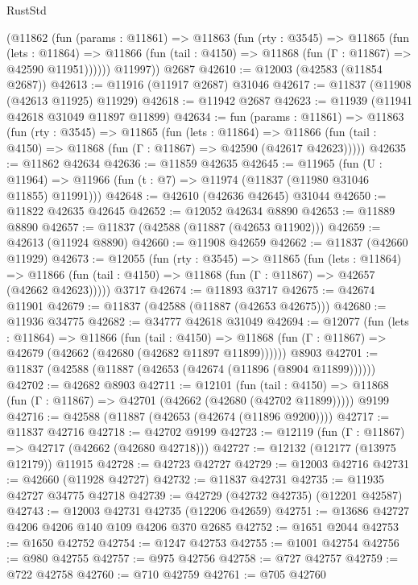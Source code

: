 \begin{lexlean}{RustStd}
\begin{coremodule}
        (@11862
          (fun (params : @11861) =>
          @11863
            (fun (rty : @3545) =>
            @11865
              (fun (lets : @11864) =>
              @11866 (fun (tail : @4150) => @11868 (fun (Γ : @11867) => @42590 @11951))))))
        @11997))
    @2687
@42610 := @12003 (@42583 (@11854 @2687))
@42613 := @11916 (@11917 @2687) @31046
@42617 := @11837 (@11908 (@42613 @11925) @11929)
@42618 := @11942 @2687
@42623 := @11939 (@11941 @42618 @31049 @11897 @11899)
@42634 := fun (params : @11861) =>
  @11863
    (fun (rty : @3545) =>
    @11865
      (fun (lets : @11864) =>
      @11866 (fun (tail : @4150) => @11868 (fun (Γ : @11867) => @42590 (@42617 @42623)))))
@42635 := @11862 @42634
@42636 := @11859 @42635
@42645 := @11965
    (fun (U : @11964) => @11966 (fun (t : @7) => @11974 (@11837 (@11980 @31046 @11855) @11991)))
@42648 := @42610 (@42636 @42645) @31044
@42650 := @11822 @42635 @42645
@42652 := @12052 @42634 @8890
@42653 := @11889 @8890
@42657 := @11837 (@42588 (@11887 (@42653 @11902)))
@42659 := @42613 (@11924 @8890)
@42660 := @11908 @42659
@42662 := @11837 (@42660 @11929)
@42673 := @12055
    (fun (rty : @3545) =>
    @11865
      (fun (lets : @11864) =>
      @11866 (fun (tail : @4150) => @11868 (fun (Γ : @11867) => @42657 (@42662 @42623)))))
    @3717
@42674 := @11893 @3717
@42675 := @42674 @11901
@42679 := @11837 (@42588 (@11887 (@42653 @42675)))
@42680 := @11936 @34775
@42682 := @34777 @42618 @31049
@42694 := @12077
    (fun (lets : @11864) =>
    @11866
      (fun (tail : @4150) =>
      @11868 (fun (Γ : @11867) => @42679 (@42662 (@42680 (@42682 @11897 @11899))))))
    @8903
@42701 := @11837 (@42588 (@11887 (@42653 (@42674 (@11896 (@8904 @11899))))))
@42702 := @42682 @8903
@42711 := @12101
    (fun (tail : @4150) => @11868 (fun (Γ : @11867) => @42701 (@42662 (@42680 (@42702 @11899)))))
    @9199
@42716 := @42588 (@11887 (@42653 (@42674 (@11896 @9200))))
@42717 := @11837 @42716
@42718 := @42702 @9199
@42723 := @12119 (fun (Γ : @11867) => @42717 (@42662 (@42680 @42718)))
@42727 := @12132 (@12177 (@13975 @12179)) @11915
@42728 := @42723 @42727
@42729 := @12003 @42716
@42731 := @42660 (@11928 @42727)
@42732 := @11837 @42731
@42735 := @11935 @42727 @34775 @42718
@42739 := @42729 (@42732 @42735) (@12201 @42587)
@42743 := @12003 @42731 @42735 (@12206 @42659)
@42751 := @13686 @42727 @4206 @4206 @140 @109 @4206 @370 @2685
@42752 := @1651 @2044
@42753 := @1650 @42752
@42754 := @1247 @42753
@42755 := @1001 @42754
@42756 := @980 @42755
@42757 := @975 @42756
@42758 := @727 @42757
@42759 := @722 @42758
@42760 := @710 @42759
@42761 := @705 @42760

\end{coremodule}
\end{lexlean}
